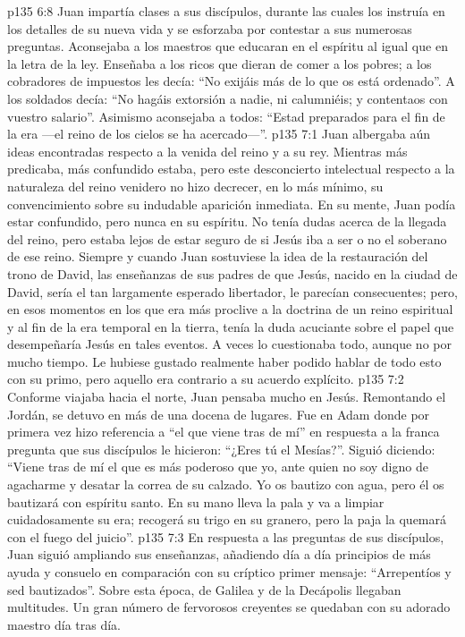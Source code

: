 \vs p135 6:8 Juan impartía clases a sus discípulos, durante las cuales los instruía en los detalles de su nueva vida y se esforzaba por contestar a sus numerosas preguntas. Aconsejaba a los maestros que educaran en el espíritu al igual que en la letra de la ley. Enseñaba a los ricos que dieran de comer a los pobres; a los cobradores de impuestos les decía: “No exijáis más de lo que os está ordenado”. A los soldados decía: “No hagáis extorsión a nadie, ni calumniéis; y contentaos con vuestro salario”. Asimismo aconsejaba a todos: “Estad preparados para el fin de la era ---el reino de los cielos se ha acercado---”.
\vs p135 7:1 Juan albergaba aún ideas encontradas respecto a la venida del reino y a su rey. Mientras más predicaba, más confundido estaba, pero este desconcierto intelectual respecto a la naturaleza del reino venidero no hizo decrecer, en lo más mínimo, su convencimiento sobre su indudable aparición inmediata. En su mente, Juan podía estar confundido, pero nunca en su espíritu. No tenía dudas acerca de la llegada del reino, pero estaba lejos de estar seguro de si Jesús iba a ser o no el soberano de ese reino. Siempre y cuando Juan sostuviese la idea de la restauración del trono de David, las enseñanzas de sus padres de que Jesús, nacido en la ciudad de David, sería el tan largamente esperado libertador, le parecían consecuentes; pero, en esos momentos en los que era más proclive a la doctrina de un reino espiritual y al fin de la era temporal en la tierra, tenía la duda acuciante sobre el papel que desempeñaría Jesús en tales eventos. A veces lo cuestionaba todo, aunque no por mucho tiempo. Le hubiese gustado realmente haber podido hablar de todo esto con su primo, pero aquello era contrario a su acuerdo explícito.
\vs p135 7:2 \pc Conforme viajaba hacia el norte, Juan pensaba mucho en Jesús. Remontando el Jordán, se detuvo en más de una docena de lugares. Fue en Adam donde por primera vez hizo referencia a “el que viene tras de mí” en respuesta a la franca pregunta que sus discípulos le hicieron: “¿Eres tú el Mesías?”. Siguió diciendo: “Viene tras de mí el que es más poderoso que yo, ante quien no soy digno de agacharme y desatar la correa de su calzado. Yo os bautizo con agua, pero él os bautizará con espíritu santo. En su mano lleva la pala y va a limpiar cuidadosamente su era; recogerá su trigo en su granero, pero la paja la quemará con el fuego del juicio”.
\vs p135 7:3 En respuesta a las preguntas de sus discípulos, Juan siguió ampliando sus enseñanzas, añadiendo día a día principios de más ayuda y consuelo en comparación con su críptico primer mensaje: “Arrepentíos y sed bautizados”. Sobre esta época, de Galilea y de la Decápolis llegaban multitudes. Un gran número de fervorosos creyentes se quedaban con su adorado maestro día tras día.
